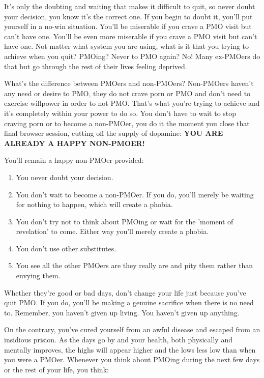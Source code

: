 \documentclass[easypeasy.tex]{subfiles}
\begin{document}
It's only the doubting and waiting that makes it difficult to quit, so never doubt your decision, you know it's the correct one. If you begin to doubt it, you'll put yourself in a no-win situation. You'll be miserable if you crave a PMO visit but can't have one. You'll be even more miserable if you crave a PMO visit but can't have one. Not matter what system you are using, what is it that you trying to achieve when you quit? PMOing? Never to PMO again? No! Many ex-PMOers do that but go through the rest of their lives feeling deprived.

What's the difference between PMOers and non-PMOers? Non-PMOers haven't any need or desire to PMO, they do not crave porn or PMO and don't need to exercise willpower in order to not PMO. That's what you're trying to achieve and it's completely within your power to do so. You don't have to wait to stop craving porn or to become a non-PMOer, you do it the moment you close that final browser session, cutting off the supply of dopamine: \textbf{YOU ARE ALREADY A HAPPY NON-PMOER!}

  You'll remain a happy non-PMOer provided:
\begin{enumerate}
  \item You never doubt your decision.
  \item You don't wait to become a non-PMOer. If you do, you'll merely be waiting for nothing to happen, which will create a phobia.
  \item You don't try not to think about PMOing or wait for the 'moment of revelation' to come. Either way you'll merely create a phobia.
  \item You don't use other substitutes.
  \item You see all the other PMOers are they really are and pity them rather than envying them.
\end{enumerate}
  
Whether they're good or bad days, don't change your life just because you've quit PMO. If you do, you'll be making a genuine sacrifice when there is no need to. Remember, you haven't given up living. You haven't given up anything.

On the contrary, you've cured yourself from an awful disease and escaped from an insidious prision. As the days go by and your health, both physically and mentally improves, the highs will appear higher and the lows less low than when you were a PMOer. Whenever you think about PMOing during the next few days or the rest of your life, you think:
\end{document}
